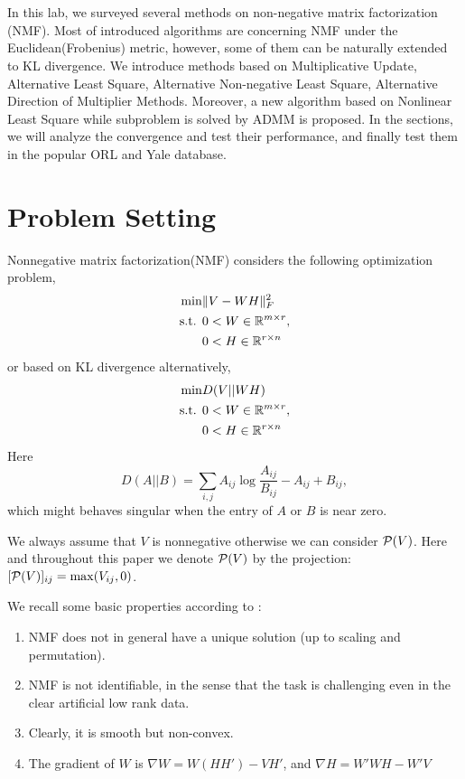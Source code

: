 \documentclass{article}
\begin{document}
	\maketitle
	\thispagestyle{fancy}
	\tableofcontents
	
	\section*{}

In this lab, we surveyed several methods on non-negative matrix factorization (NMF). Most of introduced algorithms are concerning NMF under the Euclidean(Frobenius) metric, however, some of them can be naturally extended to KL divergence. We introduce methods based on Multiplicative Update, Alternative Least Square, Alternative Non-negative Least Square, Alternative Direction of Multiplier Methods. Moreover, a new algorithm based on Nonlinear Least Square while subproblem is solved by ADMM is proposed. In the sections, we will analyze the convergence and test their performance, and finally test them in the popular ORL and Yale database.
\section{Problem Setting}
Nonnegative matrix factorization(NMF) considers the following optimization problem,
\begin{equation}
\begin{aligned}
\min& \|V-WH\|_F^2 \\
\st& 0<W\in \R^{m\times r}, \\ &0<H \in \R^{r \times n}
\end{aligned}
\end{equation}
or based on KL divergence alternatively,
\begin{equation}
\begin{aligned}
\min& D(V||WH) \\
\st& 0<W\in \R^{m\times r}, \\ &0<H \in \R^{r \times n}
\end{aligned}
\end{equation}
Here $$D(A||B) = \sum_{i,j}A_{ij}\log\frac{A_{ij}}{B_{ij}} - A_{ij} + B_{ij},$$
which might behaves singular when the entry of $A$ or $B$ is near zero. 

We always assume that $V$ is nonnegative otherwise we can consider $\P(V)$. Here and throughout this paper we denote $\P(V)$ by the projection: $[\P(V)]_{ij} = \max (V_{ij},0)$.

We recall some basic properties according to \cite{review}:
\begin{enumerate}
	\item NMF does not in general have a unique solution (up to scaling and permutation).
	\item NMF is not identifiable, in the sense that the task is challenging even in the clear artificial low rank data.
	\item Clearly, it is smooth but non-convex.
	\item The gradient of $W$ is $\nabla W = W(HH')-VH'$, and $\nabla H = W'WH-W'V$
\end{enumerate}
\end{document}
